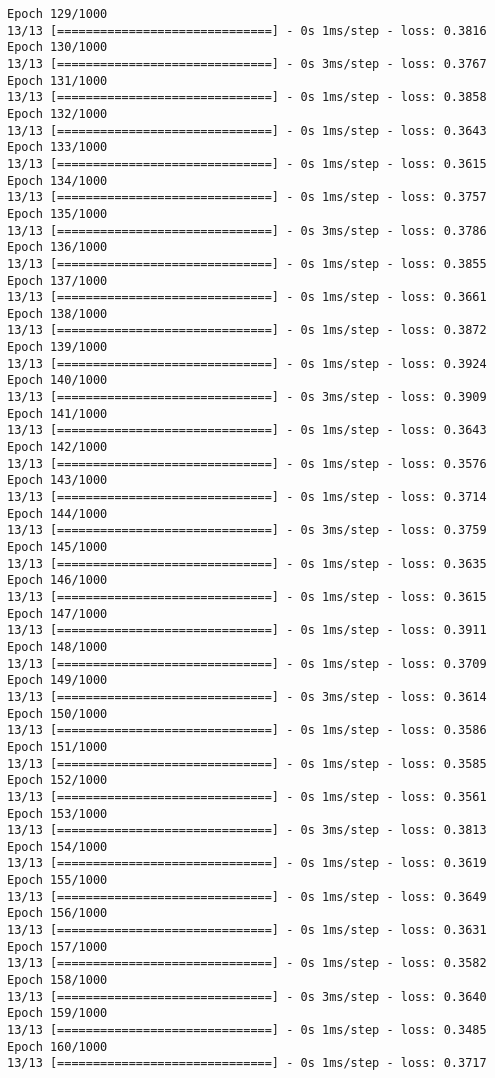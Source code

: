 \documentclass[11pt]{article}
\begin{document}
\begin{Verbatim}[commandchars=\\\{\}]
Epoch 129/1000
13/13 [==============================] - 0s 1ms/step - loss: 0.3816
Epoch 130/1000
13/13 [==============================] - 0s 3ms/step - loss: 0.3767
Epoch 131/1000
13/13 [==============================] - 0s 1ms/step - loss: 0.3858
Epoch 132/1000
13/13 [==============================] - 0s 1ms/step - loss: 0.3643
Epoch 133/1000
13/13 [==============================] - 0s 1ms/step - loss: 0.3615
Epoch 134/1000
13/13 [==============================] - 0s 1ms/step - loss: 0.3757
Epoch 135/1000
13/13 [==============================] - 0s 3ms/step - loss: 0.3786
Epoch 136/1000
13/13 [==============================] - 0s 1ms/step - loss: 0.3855
Epoch 137/1000
13/13 [==============================] - 0s 1ms/step - loss: 0.3661
Epoch 138/1000
13/13 [==============================] - 0s 1ms/step - loss: 0.3872
Epoch 139/1000
13/13 [==============================] - 0s 1ms/step - loss: 0.3924
Epoch 140/1000
13/13 [==============================] - 0s 3ms/step - loss: 0.3909
Epoch 141/1000
13/13 [==============================] - 0s 1ms/step - loss: 0.3643
Epoch 142/1000
13/13 [==============================] - 0s 1ms/step - loss: 0.3576
Epoch 143/1000
13/13 [==============================] - 0s 1ms/step - loss: 0.3714
Epoch 144/1000
13/13 [==============================] - 0s 3ms/step - loss: 0.3759
Epoch 145/1000
13/13 [==============================] - 0s 1ms/step - loss: 0.3635
Epoch 146/1000
13/13 [==============================] - 0s 1ms/step - loss: 0.3615
Epoch 147/1000
13/13 [==============================] - 0s 1ms/step - loss: 0.3911
Epoch 148/1000
13/13 [==============================] - 0s 1ms/step - loss: 0.3709
Epoch 149/1000
13/13 [==============================] - 0s 3ms/step - loss: 0.3614
Epoch 150/1000
13/13 [==============================] - 0s 1ms/step - loss: 0.3586
Epoch 151/1000
13/13 [==============================] - 0s 1ms/step - loss: 0.3585
Epoch 152/1000
13/13 [==============================] - 0s 1ms/step - loss: 0.3561
Epoch 153/1000
13/13 [==============================] - 0s 3ms/step - loss: 0.3813
Epoch 154/1000
13/13 [==============================] - 0s 1ms/step - loss: 0.3619
Epoch 155/1000
13/13 [==============================] - 0s 1ms/step - loss: 0.3649
Epoch 156/1000
13/13 [==============================] - 0s 1ms/step - loss: 0.3631
Epoch 157/1000
13/13 [==============================] - 0s 1ms/step - loss: 0.3582
Epoch 158/1000
13/13 [==============================] - 0s 3ms/step - loss: 0.3640
Epoch 159/1000
13/13 [==============================] - 0s 1ms/step - loss: 0.3485
Epoch 160/1000
13/13 [==============================] - 0s 1ms/step - loss: 0.3717

\end{Verbatim}
\end{document}
